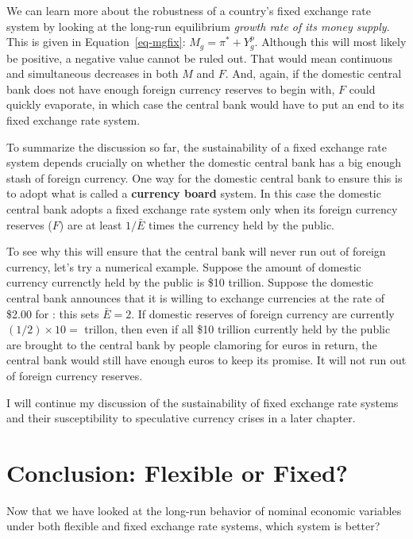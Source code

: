 \documentclass[
  letterpaper,
]{book}
\theoremstyle{plain}
\theoremstyle{remark}
\begin{document}
We can learn more about the robustness of a country's fixed exchange
rate system by looking at the long-run equilibrium \emph{growth rate of
its money supply}. This is given in Equation~\ref{eq-mgfix}:
\(M_g=\pi^*+ Y^p_g\). Although this will most likely be positive, a
negative value cannot be ruled out. That would mean continuous and
simultaneous decreases in both \(M\) and \(F\). And, again, if the
domestic central bank does not have enough foreign currency reserves to
begin with, \(F\) could quickly evaporate, in which case the central
bank would have to put an end to its fixed exchange rate system.

To summarize the discussion so far, the sustainability of a fixed
exchange rate system depends crucially on whether the domestic central
bank has a big enough stash of foreign currency. One way for the
domestic central bank to ensure this is to adopt what is called a
\textbf{currency board} system. In this case the
domestic central bank adopts a fixed exchange rate system only when its
foreign currency reserves (\(F\)) are at least \(1/\bar{E}\) times the
currency held by the public.

To see why this will ensure that the central bank will never run out of
foreign currency, let's try a numerical example. Suppose the amount of
domestic currency currenctly held by the public is \$10 trillion.
Suppose the domestic central bank announces that it is willing to
exchange currencies at the rate of \$2.00 for : this sets
\(\bar{E}=2\). If domestic reserves of foreign currency are currently
\((1/2)\times 10 =\)  trillon, then even if all \$10 trillion
currently held by the public are brought to the central bank by people
clamoring for euros in return, the central bank would still have enough
euros to keep its promise. It will not run out of foreign currency
reserves.

I will continue my discussion of the sustainability of fixed exchange
rate systems and their susceptibility to speculative currency crises in
a later chapter.

\section{Conclusion: Flexible or Fixed?}\label{sec-flexorfix}

Now that we have looked at the long-run behavior of nominal economic
variables under both flexible and fixed exchange rate systems, which
system is better?
\end{document}
